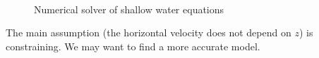 \documentclass[compress,t]{beamer}
\begin{document}
  			\begin{frame}
				\begin{figure}
					\begin{minipage}[b]{0.4\linewidth}
					\end{minipage}
					\hfill
					\begin{minipage}[b]{0.4\linewidth}
					\end{minipage}\\
					\begin{minipage}{0.9\linewidth}
						\caption{Numerical solver of shallow water equations}
					\end{minipage}
  				\end{figure}
  				\vfill
  				\pause
  				The main assumption (the horizontal velocity does not depend on $z$) is constraining. We may want to find a more accurate model. 
  				\vfill
  			\end{frame}
\end{document}
